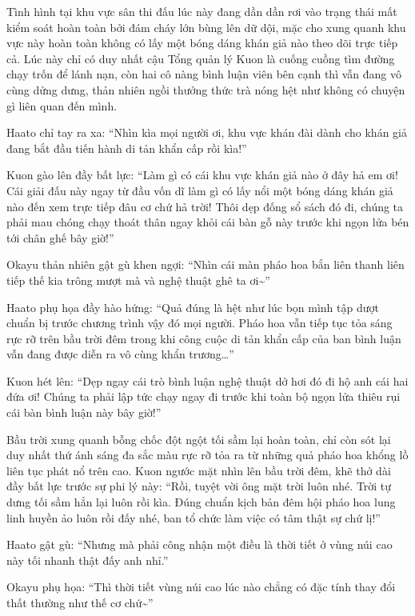 \documentclass[../main.tex]{subfiles}
\begin{document}
Tình hình tại khu vực sân thi đấu lúc này đang dần dần rơi vào trạng thái mất kiểm soát hoàn toàn bởi đám cháy lớn bùng lên dữ dội, mặc cho xung quanh khu vực này hoàn toàn không có lấy một bóng dáng khán giả nào theo dõi trực tiếp cả. Lúc này chỉ có duy nhất cậu Tổng quản lý Kuon là cuống cuồng tìm đường chạy trốn để lánh nạn, còn hai cô nàng bình luận viên bên cạnh thì vẫn đang vô cùng dửng dưng, thản nhiên ngồi thưởng thức trà nóng hệt như không có chuyện gì liên quan đến mình.

Haato chỉ tay ra xa: ``Nhìn kìa mọi người ơi, khu vực khán đài dành cho khán giả đang bắt đầu tiến hành di tản khẩn cấp rồi kìa!''

Kuon gào lên đầy bất lực: ``Làm gì có cái khu vực khán giả nào ở đây hả em ơi! Cái giải đấu này ngay từ đầu vốn dĩ làm gì có lấy nổi một bóng dáng khán giả nào đến xem trực tiếp đâu cơ chứ hả trời! Thôi dẹp đống sổ sách đó đi, chúng ta phải mau chóng chạy thoát thân ngay khỏi cái bàn gỗ này trước khi ngọn lửa bén tới chân ghế bây giờ!''

Okayu thản nhiên gật gù khen ngợi: ``Nhìn cái màn pháo hoa bắn liên thanh liên tiếp thế kia trông mượt mà và nghệ thuật ghê ta ơi\~{}''

Haato phụ họa đầy hào hứng: ``Quả đúng là hệt như lúc bọn mình tập dượt chuẩn bị trước chương trình vậy đó mọi người. Pháo hoa vẫn tiếp tục tỏa sáng rực rỡ trên bầu trời đêm trong khi công cuộc di tản khẩn cấp của ban bình luận vẫn đang được diễn ra vô cùng khẩn trương\dots''

Kuon hét lên: ``Dẹp ngay cái trò bình luận nghệ thuật dở hơi đó đi hộ anh cái hai đứa ơi! Chúng ta phải lập tức chạy ngay đi trước khi toàn bộ ngọn lửa thiêu rụi cái bàn bình luận này bây giờ!''

Bầu trời xung quanh bỗng chốc đột ngột tối sầm lại hoàn toàn, chỉ còn sót lại duy nhất thứ ánh sáng đa sắc màu rực rỡ tỏa ra từ những quả pháo hoa khổng lồ liên tục phát nổ trên cao. Kuon ngước mặt nhìn lên bầu trời đêm, khẽ thở dài đầy bất lực trước sự phi lý này: ``Rồi, tuyệt vời ông mặt trời luôn nhé. Trời tự dưng tối sầm hẳn lại luôn rồi kìa. Đúng chuẩn kịch bản đêm hội pháo hoa lung linh huyền ảo luôn rồi đấy nhé, ban tổ chức làm việc có tâm thật sự chứ lị!''

Haato gật gù: ``Nhưng mà phải công nhận một điều là thời tiết ở vùng núi cao này tối nhanh thật đấy anh nhỉ.''

Okayu phụ họa: ``Thì thời tiết vùng núi cao lúc nào chẳng có đặc tính thay đổi thất thường như thế cơ chứ\~{}''
\end{document}
